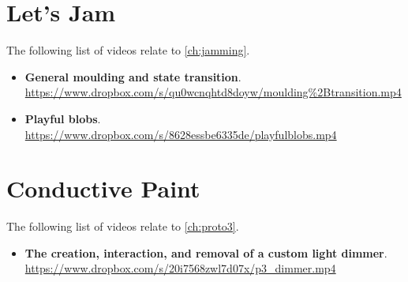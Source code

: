 \section{Let's Jam}
\label{app:videos:jamming}

The following list of videos relate to \autoref{ch:jamming}.

\begin{itemize}
	\item{\textbf{General moulding and state transition}. \\
		\url{https://www.dropbox.com/s/qu0wcnqhtd8doyw/moulding%2Btransition.mp4} } 
	\item{\textbf{Playful blobs}. \\
		\url{https://www.dropbox.com/s/8628essbe6335de/playfulblobs.mp4} } 
\end{itemize}

\section{Conductive Paint}
\label{app:videos:cpaint}

The following list of videos relate to \autoref{ch:proto3}.

\begin{itemize}
	\item{\textbf{The creation, interaction, and removal of a custom light dimmer}. \\
		\url{https://www.dropbox.com/s/20i7568zwl7d07x/p3_dimmer.mp4} }
\end{itemize}
